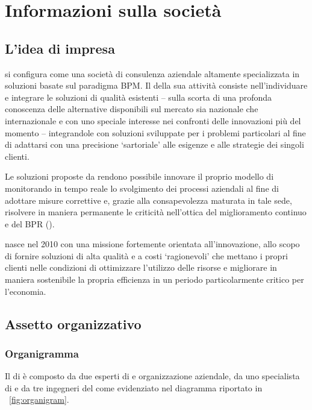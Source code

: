 \section{Informazioni sulla società}\label{sec:whoweare}

\subsection{L'idea di impresa}
\team si configura come una società di consulenza aziendale altamente specializzata in soluzioni basate sul paradigma BPM\@. Il  della sua attività consiste nell'individuare e integrare le soluzioni di qualità esistenti -- sulla scorta di una profonda conoscenza delle alternative disponibili sul mercato sia nazionale che internazionale e con uno speciale interesse nei confronti delle innovazioni più  del momento -- integrandole con  soluzioni sviluppate  per i problemi particolari al fine di adattarsi con una precisione `sartoriale' alle esigenze e alle strategie dei singoli clienti.

Le soluzioni proposte da \team rendono possibile innovare il proprio modello di \bsn monitorando in tempo reale lo svolgimento dei processi aziendali al fine di adottare misure correttive  e, grazie alla consapevolezza maturata in tale sede, risolvere in maniera permanente le criticità nell'ottica del miglioramento continuo e del BPR ().

\team nasce nel 2010 con una missione fortemente orientata all'innovazione, allo scopo di fornire soluzioni \sw di alta qualità e a costi `ragionevoli' che mettano i propri clienti nelle condizioni di ottimizzare l'utilizzo delle risorse e migliorare in maniera sostenibile la propria efficienza in un periodo particolarmente critico per l'economia.

\subsection{Assetto organizzativo}

\subsubsection{Organigramma}
Il  di \team è composto da due esperti di \bsn {} e organizzazione aziendale, da uno specialista di  e da tre ingegneri del \sw come evidenziato nel diagramma riportato in \figurename~\ref{fig:organigram}.

